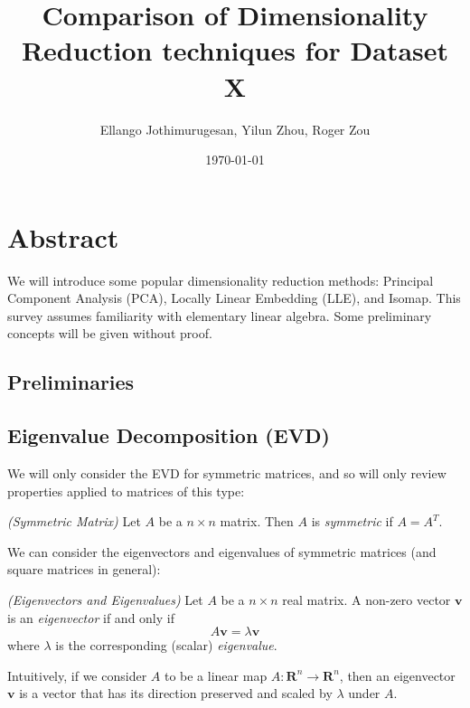 \documentclass[11pt]{article}
\title{\textbf{Comparison of Dimensionality Reduction techniques for Dataset X}}
\author{Ellango Jothimurugesan, Yilun Zhou, Roger Zou}
\date{\today}
\newenvironment{definition}[1][Definition]{\begin{trivlist}
\item[\hskip \labelsep {\bfseries #1}]}{\end{trivlist}}
\begin{document}
\maketitle


\section*{Abstract}
We will introduce some popular dimensionality reduction methods: Principal Component Analysis (PCA), Locally Linear Embedding (LLE), and Isomap. This survey assumes familiarity with elementary linear algebra. Some preliminary concepts will be given without proof.


\begin{multicols}{2}


\section*{Preliminaries}

\subsection*{Eigenvalue Decomposition (EVD)}

We will only consider the EVD for symmetric matrices, and so will only review properties applied to matrices of this type:
\begin{definition}
\emph{(Symmetric Matrix)}
Let $A$ be a $n \times n$ matrix. Then $A$ is \textit{symmetric} if $A = A^T$.
\end{definition}

We can consider the eigenvectors and eigenvalues of symmetric matrices (and square matrices in general):
\begin{definition}
\emph{(Eigenvectors and Eigenvalues)}
Let $A$ be a $n \times n$ real matrix. A non-zero vector $\mathbf{v}$ is an \textit{eigenvector} if and only if
\[A\mathbf{v} = \lambda \mathbf{v}\]
where $\lambda$ is the corresponding (scalar) \textit{eigenvalue}.
\end{definition}
Intuitively, if we consider $A$ to be a linear map $A: \mathbf{R}^n \rightarrow \mathbf{R}^n$, then an eigenvector $\mathbf{v}$ is a vector that has its direction preserved and scaled by $\lambda$ under $A$. \\


\end{multicols}
\end{document}
